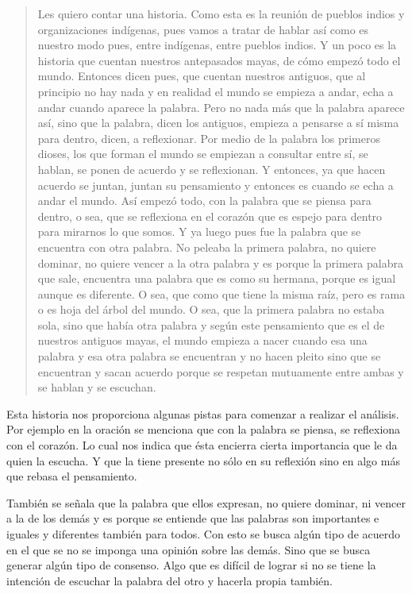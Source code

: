 \documentclass[oneside]{book}
\begin{document}
\begin{quote}
Les quiero contar una historia. Como esta es la reunión de pueblos indios y organizaciones indígenas, pues vamos a tratar de hablar así como es nuestro modo pues, entre indígenas, entre pueblos indios. Y un poco es la historia que cuentan nuestros antepasados mayas, de cómo empezó todo el mundo. Entonces dicen pues, que cuentan nuestros antiguos, que al principio no hay nada y en realidad el mundo se empieza a andar, echa a andar cuando aparece la palabra. Pero no nada más que la palabra aparece así, sino que la palabra, dicen los antiguos, empieza a pensarse a sí misma para dentro, dicen, a reflexionar. Por medio de la palabra los primeros dioses, los que forman el mundo se empiezan a consultar entre sí, se hablan, se ponen de acuerdo y se reflexionan. Y entonces, ya que hacen acuerdo se juntan, juntan su pensamiento y entonces es cuando se echa a andar el mundo. Así empezó todo, con la palabra que se piensa para dentro, o sea, que se reflexiona en el corazón que es espejo para dentro para mirarnos lo que somos. Y ya luego pues fue la palabra que se encuentra con otra palabra. No peleaba la primera palabra, no quiere dominar, no quiere vencer a la otra palabra y es porque la primera palabra que sale, encuentra una palabra que es como su hermana, porque es igual aunque es diferente. O sea, que como que tiene la misma raíz, pero es rama o es hoja del árbol del mundo. O sea, que la primera palabra no estaba sola, sino que había otra palabra y según este pensamiento que es el de nuestros antiguos mayas, el mundo empieza a nacer cuando esa una palabra y esa otra palabra se encuentran y no hacen pleito sino que se encuentran y sacan acuerdo porque se respetan mutuamente entre ambas y se hablan y se escuchan.
\end{quote}

Esta historia nos proporciona algunas pistas para comenzar a realizar el análisis. Por ejemplo en la oración se menciona que con la palabra se piensa, se reflexiona con el corazón. Lo cual nos indica que ésta encierra cierta importancia que le da quien la escucha. Y que la tiene presente no sólo en su reflexión sino en algo más que rebasa el pensamiento.

También se señala que la palabra que ellos expresan, no quiere dominar, ni vencer a la de los demás y es porque se entiende que las palabras son importantes e iguales y diferentes también para todos. Con esto se busca algún tipo de acuerdo en el que se no se imponga una opinión sobre las demás. Sino que se busca generar algún tipo de consenso. Algo que es difícil de lograr si no se tiene la intención de escuchar la palabra del otro y hacerla propia también.
\end{document}
